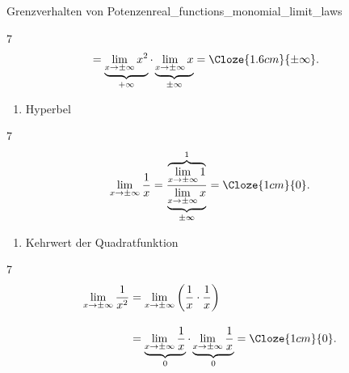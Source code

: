\begin{ExampleBox}{Grenzverhalten von Potenzen}{real_functions_monomial_limit_laws}
\begin{minipage}[t]{0.47\linewidth}
\begin{ClozeArea}[16]{7}
\[\begin{aligned}
          &=\underbrace{\lim_{x\to\pm\infty}x^2}_{+\infty}
            \cdot\underbrace{\lim_{x\to\pm\infty}x}_{\pm\infty}
          =\Cloze{1.6cm}{\pm\infty}.
        \end{aligned}
      \]
    \end{ClozeArea}
  \end{minipage}
  \par\vspace{1.5\baselineskip}\noindent
  \begin{minipage}[t]{0.47\linewidth}
    \begin{enumerate}[label=\alph*),start=3,leftmargin=*,topsep=0pt]
      \item Hyperbel
    \end{enumerate}
    \vspace{0.4\baselineskip}
    \begin{minipage}[c][5.2cm][c]{\linewidth}
      \centering
    \end{minipage}
    \par\vspace{0.6\baselineskip}
    \begin{ClozeArea}[16]{7}
    \[
      \lim_{x\to\pm\infty}\frac1x
      =\frac{\overbrace{\displaystyle\lim_{x\to\pm\infty}1}^{1}}
        {\underbrace{\displaystyle\lim_{x\to\pm\infty}x}_{\pm\infty}}
      =\Cloze{1cm}{0}.
    \]
    \end{ClozeArea}
  \end{minipage}\hfill
  \begin{minipage}[t]{0.47\linewidth}
    \begin{enumerate}[label=\alph*),start=4,leftmargin=*,topsep=0pt]
      \item Kehrwert der Quadratfunktion
    \end{enumerate}
    \vspace{0.4\baselineskip}
    \begin{minipage}[c][5.2cm][c]{\linewidth}
      \centering
    \end{minipage}
    \par\vspace{0.6\baselineskip}
    \begin{ClozeArea}[16]{7}
    \[
      \begin{aligned}
        \lim_{x\to\pm\infty}\frac1{x^2}
        &=\lim_{x\to\pm\infty}\left(\frac1x\cdot\frac1x\right)\\[1em]
        &=\underbrace{\lim_{x\to\pm\infty}\frac1x}_{0}
          \cdot\underbrace{\lim_{x\to\pm\infty}\frac1x}_{0}
          =\Cloze{1cm}{0}.
      \end{aligned}
    \]
    \end{ClozeArea}
  \end{minipage}
\end{ExampleBox}
